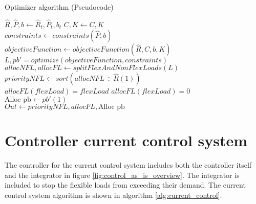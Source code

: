\begin{algorithm}
\caption{Optimizer algorithm (Pseudocode)}\label{alg:optimizer}
\begin{algorithmic}
    \State$\hat{R},\hat{P},b  \gets \hat{R}_t,\hat{P}_t,b_t$                        
    \State$C, K \gets C, K $                                                        \\
    
                                                      
    \State$constraints \gets constraints(\hat{P},b)$                                
    \State$objectiveFunction \gets objectiveFunction(\hat{R},C,b,K)$                
    \State$L,pb' = optimize(objectiveFunction, constraints)$
    \State$allocNFL,allocFL \gets splitFlexAndNonFlexLoads(L)$
    \\
    \State$priorityNFL \gets sort(allocNFL\div\hat{R}(1))$                          \\
    

                                                
            \State$allocFL(flexLoad) = flexLoad$
        \Else
            \State$allocFL(flexLoad) = 0$
        \EndIf
    \EndFor\\
    
    \State$\text{Alloc pb} \gets pb'(1)$                                                         \\

    \State  $Out \gets priorityNFL,  allocFL,  \text{Alloc pb}$
\EndIf
\end{algorithmic}
\end{algorithm}

\section{Controller current control system}
The controller for the current control system includes both the controller itself and the integrator in figure \ref{fig:control_as_is_overview}. The integrator is included to stop the flexible loads from exceeding their demand. The current control system algorithm is shown in algorithm \ref{alg:current_control}.

